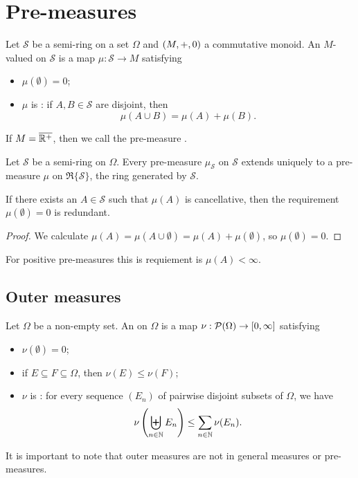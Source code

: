 \section{Pre-measures}
\begin{definition}
Let $\mathcal{S}$ be a semi-ring on a set $\Omega$ and $\left( M,+,0 \right)$ a commutative monoid. An $M$-valued  on $\mathcal{S}$ is a map $\mu: \mathcal{S} \to M$ satisfying
\begin{itemize}
\item $\mu(\emptyset) = 0$;
\item $\mu$ is : if $A,B \in \mathcal{S}$ are disjoint, then
\[ \mu(A\cup B) = \mu(A)+\mu(B). \]
\end{itemize}
If $M = \overline{\mathbb{R}^+}$, then we call the pre-measure .
\end{definition}
\begin{proposition}
Let $\mathcal{S}$ be a semi-ring on $\Omega$. Every pre-measure $\mu_\mathcal{S}$ on $\mathcal{S}$ extends uniquely to a pre-measure $\mu$ on $\mathfrak{R}\{\mathcal{S}\}$, the ring generated by $\mathcal{S}$.
\end{proposition}

\begin{lemma} \label{emptysetNullset}
If there exists an $A\in \mathcal{S}$ such that $\mu(A)$ is cancellative, then the requirement $\mu(\emptyset) = 0$ is redundant.
\end{lemma}
\begin{proof}
We calculate $\mu(A) = \mu(A \cup \emptyset) = \mu(A) + \mu(\emptyset)$, so $\mu(\emptyset) = 0$.
\end{proof}
For positive pre-measures this is requiement is $\mu(A) < \infty$.


\subsection{Outer measures}
\begin{definition}
Let $\Omega$ be a non-empty set. An  on $\Omega$ is a map $\nu: \operatorname{\mathcal{P}}(\Omega)\to [0,\infty]$ satisfying
\begin{itemize}
\item $\nu(\emptyset) = 0$;
\item if $E\subseteq F\subseteq \Omega$, then $\nu(E)\leq \nu(F)$;
\item $\nu$ is : for every sequence $(E_n)$ of pairwise disjoint subsets of $\Omega$, we have
\[ \nu\left(\biguplus_{n\in\mathbb{N}}E_n\right) \leq \sum_{n\in\mathbb{N}}\nu(E_n). \]
\end{itemize}
\end{definition}
It is important to note that outer measures are not in general measures or pre-measures.



